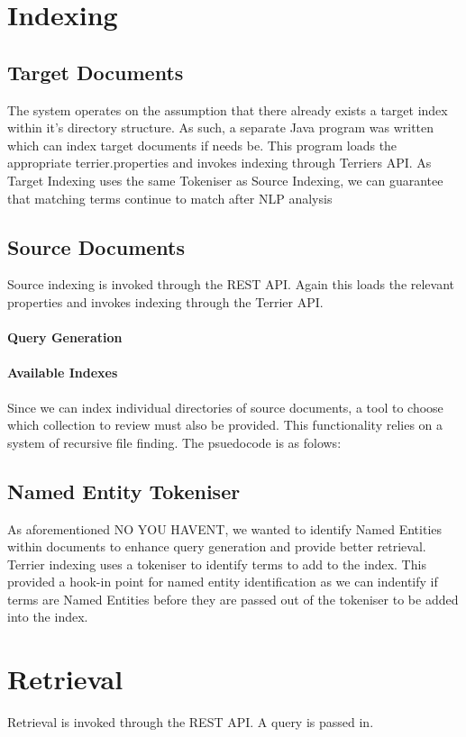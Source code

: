 \documentclass{l4proj}
\begin{document}
\section{Indexing}
\subsection{Target Documents}
The system operates on the assumption that there already exists a target index within it's directory structure.
As such, a separate Java program was written which can index target documents if needs be. This program loads the appropriate terrier.properties and invokes indexing through Terriers API. As Target Indexing uses the same Tokeniser as Source Indexing, we can guarantee that matching terms continue to match after NLP analysis

\subsection{Source Documents}
Source indexing is invoked through the REST API. Again this loads the relevant properties and invokes indexing through the Terrier API.

\paragraph{Query Generation}

\paragraph{Available Indexes}
Since we can index individual directories of source documents, a tool to choose which collection to review must also be provided. This functionality relies on a system of recursive file finding. The psuedocode is as folows:

\subsection{Named Entity Tokeniser}
As aforementioned NO YOU HAVENT, we wanted to identify Named Entities within documents to enhance query generation and provide better retrieval. Terrier indexing uses a tokeniser to identify terms to add to the index. This provided a hook-in point for named entity identification as we can indentify if terms are Named Entities before they are passed out of the tokeniser to be added into the index.

\section{Retrieval}
Retrieval is invoked through the REST API. A query is passed in.
\end{document}
